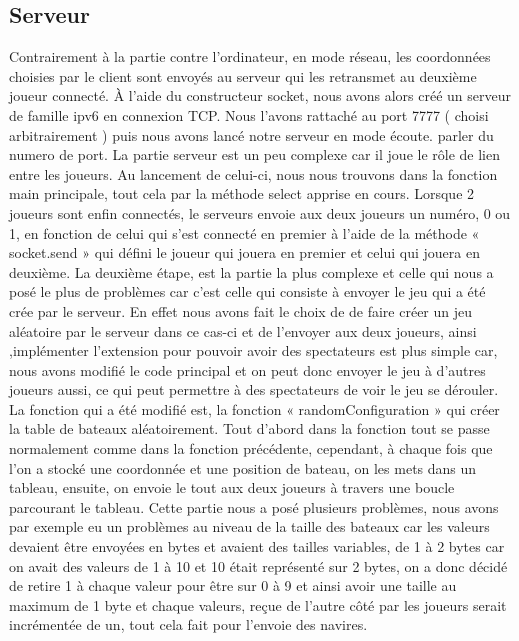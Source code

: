 \documentclass{article}
\begin{document}
	\subsection{Serveur}
	Contrairement \`a la partie contre l'ordinateur, en mode r\'eseau, les coordonn\'ees choisies par le client sont envoy\'es au serveur qui les retransmet au deuxi\`eme joueur connect\'e.
	\`A l'aide du constructeur socket, nous avons alors cr\'e\'e un serveur de famille ipv6 en connexion TCP.
	Nous l'avons rattach\'e au port 7777 ( choisi arbitrairement ) puis nous avons lanc\'e notre serveur en mode \'ecoute.
	parler du numero de port.
	\newline
	\newline La partie serveur est un peu complexe car il joue le rôle de lien entre les joueurs. 
	Au lancement de celui-ci, nous nous trouvons dans la fonction main principale, tout cela par la méthode
	select apprise en cours. 
	Lorsque 2 joueurs sont enfin connectés, le serveurs envoie aux deux joueurs un numéro, 0 ou 1, en fonction de celui qui s’est connecté en premier à l’aide de la méthode « socket.send » qui défini le joueur qui jouera en premier et celui qui jouera en deuxième. 
	La deuxième étape, est la partie la plus complexe et celle qui nous a posé le plus de problèmes car c’est celle qui consiste à envoyer le jeu qui a été crée par le serveur.
	En effet nous avons fait le choix de de faire créer un jeu aléatoire par le serveur dans ce cas-ci et de l’envoyer aux deux joueurs, ainsi ,implémenter l’extension pour pouvoir avoir des spectateurs est plus simple car, nous avons modifié le code principal et on peut donc envoyer le jeu à d’autres joueurs aussi, ce qui peut permettre à des spectateurs de voir le jeu se dérouler.
	La fonction qui a été modifié est, la fonction « randomConfiguration » qui créer la table de bateaux aléatoirement.
	Tout d’abord dans la fonction tout se passe normalement comme dans la fonction précédente, cependant, à chaque fois que l’on a stocké une coordonnée et une position de bateau, on les mets dans un tableau, ensuite, on envoie le tout aux deux joueurs à travers une boucle parcourant le tableau.
	Cette partie nous a posé plusieurs problèmes, nous avons par exemple eu un problèmes au niveau de la taille des bateaux car les valeurs devaient être envoyées en  bytes et avaient des tailles variables, de 1 à 2 bytes car on avait des valeurs de 1 à 10 et 10 était représenté sur 2 bytes, on a donc décidé de retire 1 à chaque valeur pour être sur 0 à 9 et ainsi avoir une taille au maximum de 1 byte et chaque valeurs, reçue de l’autre côté par les joueurs serait incrémentée de un, tout cela fait pour l’envoie des navires. 
\end{document}
